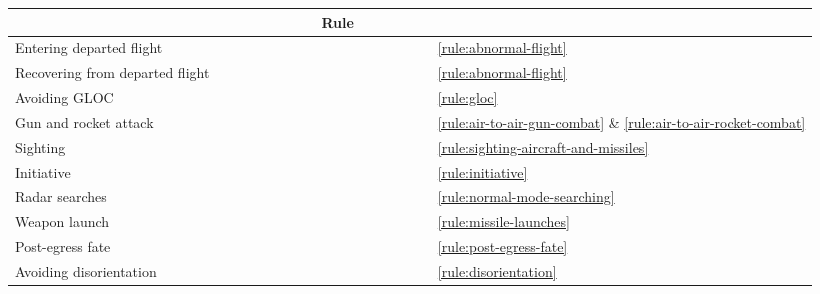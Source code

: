 \begin{twocolumntablefloat}
\begin{twocolumntable}
{\begin{tabularx}{1.0\linewidth}{l*{13}{C}l}
&&
&&
&&&
&Rule\\
\midrule
Entering departed flight        &&    &&&     &     &    &     &&& &    &    
&\ref{rule:abnormal-flight}\\
Recovering from departed flight &&    &    &&     &     &    &     &    &    & &    &    
&\ref{rule:abnormal-flight}\\
Avoiding GLOC                   &    &    &&&     &     && &    &    &     &    &    
&\ref{rule:gloc}\\
Gun and rocket attack           &&    &&&     &     &    &     &    &    &     &    &
&\ref{rule:air-to-air-gun-combat} \& \ref{rule:air-to-air-rocket-combat}\\
Sighting                        &&    &&& & &    &     &    &    &     &&    
&\ref{rule:sighting-aircraft-and-missiles}\\
Initiative                      &&    &&&     &     &    &     &&& &&
&\ref{rule:initiative}\\
Radar searches                  &&    &&&     &     &    &     &    &    &     &&    
&\ref{rule:normal-mode-searching}\\
Weapon launch                   &&    &    &&     &     &    &     &    &    &     &&
&\ref{rule:missile-launches}\\
Post-egress fate                &    &    &    &    &     &     && &&&     &    &    
&\ref{rule:post-egress-fate}\\
Avoiding disorientation         &&    &    &     &    &     &    &     &&&     &    &    
&\ref{rule:disorientation}\\
\bottomrule
\end{tabularx}
}
\end{twocolumntable}
\end{twocolumntablefloat}